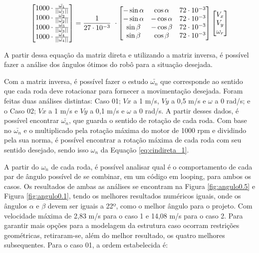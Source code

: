 \documentclass[deposito, acronym, symbols]{fei}
\begin{document}
\begin{equation} \label{eq:robofei}
\centering  
    \begin{bmatrix} 1000 \cdot \frac{  \bar{\omega_1}}{\left ||\bar{\omega_1} \right ||} \\1000 \cdot \frac{  \bar{\omega_2}}{\left ||\bar{\omega_2} \right ||}\\1000 \cdot \frac{  \bar{\omega_3}}{\left ||\bar{\omega_3} \right ||}\\1000 \cdot \frac{  \bar{\omega_4}}{\left ||\bar{\omega_4} \right ||} \end{bmatrix} = \frac{1}{27 \cdot 10^{-3}}\
\cdot 
    \begin{bmatrix}
    -\sin\alpha & \cos\alpha & 72 \cdot 10^{-3} \\ 
    -\sin\alpha & -\cos\alpha & 72 \cdot 10^{-3} \\ 
    \sin\beta & -\cos\beta & 72 \cdot 10^{-3} \\ 
    \sin\beta & \cos\beta & 72 \cdot 10^{-3}
\end{bmatrix}
   \begin{bmatrix}V_x\\V_y\\\omega_r\end{bmatrix}  
\end{equation}

A partir dessa equação da matriz direta e utilizando a matriz inversa, é possível fazer a análise dos ângulos ótimos do robô para a situação desejada.

Com a matriz inversa, é possível fazer o estudo $\bar{\omega_n}$ que corresponde ao sentido que cada roda deve rotacionar para fornecer a movimentação desejada. Foram feitas duas análises distintas: Caso 01; $Vx$ a 1 m/s, $Vy$ a 0,5 m/s e $\omega$ a 0 rad/s; e o Caso 02; $Vx$ a 1 m/s e $Vy$ a 0,1 m/s e $\omega$ a 0 rad/s. A partir desses dados, é possível encontrar $\bar{\omega_n}$, que guarda o sentido de rotação de cada roda. Com base no $\bar{\omega_n}$ e o multiplicado pela rotação máxima do motor de 1000 rpm e dividindo pela sua norma, é possível encontrar a rotação máxima de cada roda com seu sentido desejado, sendo isso $\omega_n$ da Equação \ref{eq:cindireta_1}.

A partir do $\omega_n$ de cada roda, é possível analisar qual é o comportamento de cada par de ângulo possível de se combinar, em um código em looping, para ambos os casos. Os resultados de ambas as análises se encontram na Figura \ref{fig:angulo0.5} e Figura \ref{fig:angulo0.1}, tendo os melhores resultados numéricos iguais, onde os ângulos $\alpha$ e $\beta$ devem ser iguais a 22º, como o melhor ângulo para o projeto. Com velocidade máxima de 2,83 m/s para o caso 1 e 14,08 m/s para o caso 2. Para garantir mais opções para a modelagem da estrutura caso ocorram restrições geométricas, retiraram-se, além do melhor resultado, os quatro melhores subsequentes. Para o caso 01, a ordem estabelecida é: 
\end{document}
